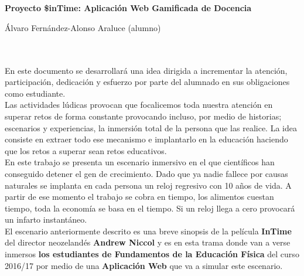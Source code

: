 \chapter*{}






\cleardoublepage
\thispagestyle{empty}

\begin{center}
{\large\bfseries Proyecto \$inTime: Aplicación Web Gamificada de Docencia }\\
\end{center}
\begin{center}
Álvaro Fernández-Alonso Araluce (alumno)\\
\end{center}

\\

\vspace{0.7cm}
\\

En este documento se desarrollará una idea dirigida a incrementar la atención, participación, dedicación y esfuerzo por parte del alumnado en sus obligaciones como estudiante.\\

Las actividades lúdicas provocan que focalicemos toda nuestra atención en superar retos de forma constante provocando incluso, por medio de historias; escenarios y experiencias, la inmersión total de la persona que las realice. La idea consiste en extraer todo ese mecanismo e implantarlo en la educación haciendo que los retos a superar sean retos educativos.\\

En este trabajo se presenta un escenario inmersivo en el que científicos han conseguido detener el gen de crecimiento. Dado que ya nadie fallece por causas naturales se implanta en cada persona un reloj regresivo con 10 años de vida. A partir de ese momento el trabajo se cobra en tiempo, los alimentos cuestan tiempo, toda la economía se basa en el tiempo. Si un reloj llega a cero provocará un infarto instantáneo.\\

El escenario anteriormente descrito es una breve sinopsis de la película \textbf{InTime} del director neozelandés \textbf{Andrew Niccol} y es en esta trama donde van a verse inmersos \textbf{los estudiantes de Fundamentos de la Educación Física} del curso 2016/17 por medio de una \textbf{Aplicación Web} que va a simular este escenario.\\

